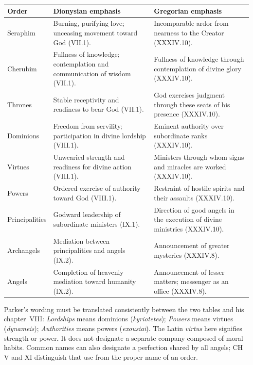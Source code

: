 \begingroup
\small
\setlength{\tabcolsep}{4pt}
\begin{longtable}{@{}>{\raggedright\arraybackslash}p{.18\linewidth}>{\raggedright\arraybackslash}p{.36\linewidth}>{\raggedright\arraybackslash}p{.39\linewidth}@{}}
\toprule
Order & Dionysian emphasis & Gregorian emphasis \\
\midrule
\endhead
Seraphim & Burning, purifying love; unceasing movement toward God (VII.1). & Incomparable ardor from nearness to the Creator (XXXIV.10). \\
Cherubim & Fullness of knowledge; contemplation and communication of wisdom (VII.1). & Fullness of knowledge through contemplation of divine glory (XXXIV.10). \\
Thrones & Stable receptivity and readiness to bear God (VII.1). & God exercises judgment through these seats of his presence (XXXIV.10). \\
Dominions & Freedom from servility; participation in divine lordship (VIII.1). & Eminent authority over subordinate ranks (XXXIV.10). \\
Virtues & Unwearied strength and readiness for divine action (VIII.1). & Ministers through whom signs and miracles are worked (XXXIV.10). \\
Powers & Ordered exercise of authority toward God (VIII.1). & Restraint of hostile spirits and their assaults (XXXIV.10). \\
Principalities & Godward leadership of subordinate ministers (IX.1). & Direction of good angels in the execution of divine ministries (XXXIV.10). \\
Archangels & Mediation between principalities and angels (IX.2). & Announcement of greater mysteries (XXXIV.8). \\
Angels & Completion of heavenly mediation toward humanity (IX.2). & Announcement of lesser matters; messenger as an office (XXXIV.8). \\
\bottomrule
\end{longtable}
\endgroup

Parker's wording must be translated consistently between the two tables and his chapter~VIII: \emph{Lordships} means dominions (\emph{kyriotetes}); \emph{Powers} means virtues (\emph{dynameis}); \emph{Authorities} means powers (\emph{exousiai}). The Latin \emph{virtus} here signifies strength or power. It does not designate a separate company composed of moral habits. Common names can also designate a perfection shared by all angels; CH V and XI distinguish that use from the proper name of an order.
